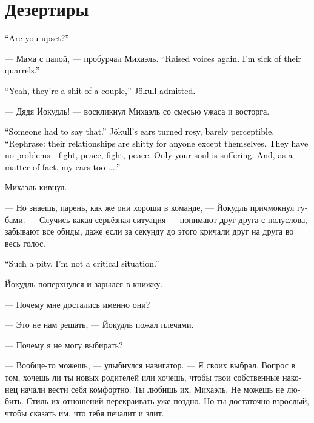 \documentclass[a4paper,12pt,fleqn]{book}\usepackage{cooltooltips}\usepackage{polyglossia}\setdefaultlanguage[babelshorthands=true]{russian}\setotherlanguage{english}\defaultfontfeatures{Ligatures=TeX,Mapping=tex-text} \usepackage{xcolor}\definecolor{lightgray}{HTML}{bbbbbb}\color{lightgray}\newcommand{\ml}[3]{\textenglish{\textcolor{black}{#3}}}
\begin{document}
\section{Дезертиры}

\ml{$0$}
{--- Ты чем-то опечален?}
{``Are you upset?''}

--- Мама с папой, --- пробурчал Михаэль.
\ml{$0$}
{--- Опять разговор на повышенных тонах.}
{``Raised voices again.}
\ml{$0$}
{Терпеть не могу эти их скандалы.}
{I'm sick of their quarrels.''}

\ml{$0$}
{--- Да, пара из них дерьмовая, --- признал Йокудль.}
{``Yeah, they're a shit of a couple,'' Jökull admitted.}

--- Дядя Йокудль! --- воскликнул Михаэль со смесью ужаса и восторга.

\ml{$0$}
{--- Кто-то должен был это сказать вслух, --- уши Йокудля едва заметно порозовели.}
{``Someone had to say that.'' Jökull's ears turned rosy, barely perceptible.}
\ml{$0$}
{--- Вернее, дерьмовая она для всех, кроме них.}
{``Rephrase: their relationships are shitty for anyone except themselves.}
\ml{$0$}
{Им хорошо --- поругались, помирились, поругались, помирились.}
{They have no problems---fight, peace, fight, peace.}
\ml{$0$}
{Страдает только твоя душа.}
{Only your soul is suffering.}
\ml{$0$}
{И мои уши, если честно, тоже...}
{And, as a matter of fact, my ears too ....''}

Михаэль кивнул.

--- Но знаешь, парень, как же они хороши в команде, --- Йокудль причмокнул губами.
--- Случись какая серьёзная ситуация --- понимают друг друга с полуслова, забывают все обиды, даже если за секунду до этого кричали друг на друга во весь голос.

\ml{$0$}
{--- Как жаль, что я не серьёзная ситуация.}
{``Such a pity, I'm not a critical situation.''}

Йокудль поперхнулся и зарылся в книжку.

--- Почему мне достались именно они?

--- Это не нам решать, --- Йокудль пожал плечами.

--- Почему я не могу выбирать?

--- Вообще-то можешь, --- улыбнулся навигатор.
--- Я своих выбрал.
Вопрос в том, хочешь ли ты новых родителей или хочешь, чтобы твои собственные наконец начали вести себя комфортно.
Ты любишь их, Михаэль.
Не можешь не любить.
Стиль их отношений перекраивать уже поздно.
Но ты достаточно взрослый, чтобы сказать им, что тебя печалит и злит.
\end{document}

